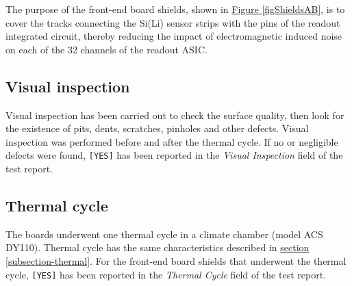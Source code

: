 The purpose of the front-end board shields, shown in \hyperref[figShieldsAB]{Figure \ref{figShieldsAB}}, is to cover the tracks connecting the Si(Li) sensor strips with the pins of the readout integrated circuit, thereby reducing the impact of electromagnetic induced noise on each of the 32 channels of the readout ASIC.

\subsection{Visual inspection}
Visual inspection has been carried out to check the surface quality, then look for the existence of pits, dents, scratches, pinholes and other defects. Visual inspection was performed before and after the thermal cycle. If no or negligible defects were found, \texttt{[YES]} has been reported in the \textit{Visual Inspection} field of the test report.

\subsection{Thermal cycle}
The boards underwent one thermal cycle in a climate chamber (model ACS DY110). Thermal cycle has the same characteristics described in \hyperref[subsection-thermal]{section \ref{subsection-thermal}}. For the front-end board shields that underwent the thermal cycle, \texttt{[YES]} has been reported in the \textit{Thermal Cycle} field of the test report.

